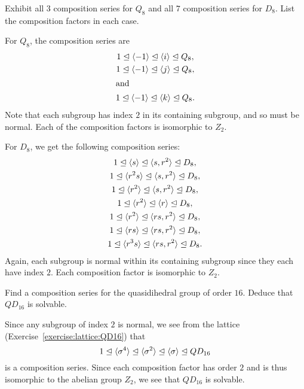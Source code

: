  Exhibit all $3$ composition series for $Q_8$ and all $7$
composition series for $D_8$. List the composition factors in each
case.
\begin{solution}
  For $Q_8$, the composition series are
  \begin{gather*}
    1 \trianglelefteq \langle{-1}\rangle
    \trianglelefteq \langle{i}\rangle
    \trianglelefteq Q_8, \\
    1 \trianglelefteq \langle{-1}\rangle
    \trianglelefteq \langle{j}\rangle
    \trianglelefteq Q_8, \\
    \intertext{and}
    1 \trianglelefteq \langle{-1}\rangle
    \trianglelefteq \langle{k}\rangle
    \trianglelefteq Q_8.
  \end{gather*}
  Note that each subgroup has index $2$ in its containing subgroup,
  and so must be normal. Each of the composition factors is isomorphic
  to $Z_2$.

  For $D_8$, we get the following composition series:
  \begin{gather*}
    1 \trianglelefteq \langle{s}\rangle
    \trianglelefteq \langle{s,r^2}\rangle
    \trianglelefteq D_8, \\
    1 \trianglelefteq \langle{r^2s}\rangle
    \trianglelefteq \langle{s,r^2}\rangle
    \trianglelefteq D_8, \\
    1 \trianglelefteq \langle{r^2}\rangle
    \trianglelefteq \langle{s,r^2}\rangle
    \trianglelefteq D_8, \\
    1 \trianglelefteq \langle{r^2}\rangle
    \trianglelefteq \langle{r}\rangle
    \trianglelefteq D_8, \\
    1 \trianglelefteq \langle{r^2}\rangle
    \trianglelefteq \langle{rs,r^2}\rangle
    \trianglelefteq D_8, \\
    1 \trianglelefteq \langle{rs}\rangle
    \trianglelefteq \langle{rs,r^2}\rangle
    \trianglelefteq D_8, \\
    1 \trianglelefteq \langle{r^3s}\rangle
    \trianglelefteq \langle{rs,r^2}\rangle
    \trianglelefteq D_8.
  \end{gather*}
  Again, each subgroup is normal within its containing subgroup since
  they each have index $2$. Each composition factor is isomorphic to
  $Z_2$.
\end{solution}

 Find a composition series for the quasidihedral group of
order $16$. Deduce that $QD_{16}$ is solvable.
\begin{solution}
  Since any subgroup of index $2$ is normal, we see from the lattice
  (Exercise~\ref{exercise:lattice:QD16}) that
  \begin{equation*}
    1 \trianglelefteq \langle{\sigma^4}\rangle
    \trianglelefteq \langle{\sigma^2}\rangle
    \trianglelefteq \langle{\sigma}\rangle
    \trianglelefteq QD_{16}
  \end{equation*}
  is a composition series. Since each composition factor has order $2$
  and is thus isomorphic to the abelian group $Z_2$, we see that
  $QD_{16}$ is solvable.
\end{solution}

